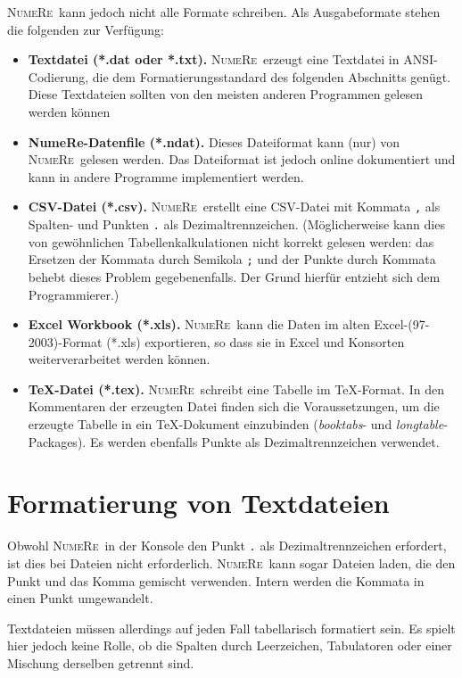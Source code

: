 \documentclass[DIV=14,headsepline,footsepline]{scrbook}
\newcommand{\NR}{\textsc{Nu\-me\-Re}}
\begin{document}
				\NR\ kann jedoch nicht alle Formate schreiben. Als Ausgabeformate stehen die folgenden zur Verfügung:
				\begin{itemize}
					\item \textbf{Textdatei (*.dat oder *.txt).} \NR\ erzeugt eine Textdatei in ANSI-Codierung, die dem Formatierungsstandard des folgenden Abschnitts genügt. Diese Textdateien sollten von den meisten anderen Programmen gelesen werden können
					\item \textbf{NumeRe-Datenfile (*.ndat).} Dieses Dateiformat kann (nur) von \NR\ gelesen werden. Das Dateiformat ist jedoch online dokumentiert und kann in andere Programme implementiert werden.
					\item \textbf{CSV-Datei (*.csv).} \NR\ erstellt eine CSV-Datei mit Kommata \lstinline+,+ als Spalten- und Punkten \lstinline+.+ als Dezimaltrennzeichen. (Möglicherweise kann dies von gewöhnlichen Tabellenkalkulationen nicht korrekt gelesen werden: das Ersetzen der Kommata durch Semikola \lstinline+;+ und der Punkte durch Kommata behebt dieses Problem gegebenenfalls. Der Grund hierfür entzieht sich dem Programmierer.)
					\item \textbf{Excel Workbook (*.xls).} \NR\ kann die Daten im alten Excel-(97-2003)-Format (*.xls) exportieren, so dass sie in Excel und Konsorten weiterverarbeitet werden können.
					\item \textbf{\TeX-Datei (*.tex).} \NR\ schreibt eine Tabelle im \TeX-Format. In den Kommentaren der erzeugten Datei finden sich die Voraussetzungen, um die erzeugte Tabelle in ein \TeX-Do\-ku\-ment einzubinden (\emph{booktabs}- und \emph{longtable}-Packages). Es werden ebenfalls Punkte als Dezimaltrennzeichen verwendet.
				\end{itemize}
				
			\section{Formatierung von Textdateien}
				Obwohl \NR\ in der Konsole den Punkt \lstinline+.+ als Dezimaltrennzeichen erfordert, ist dies bei Dateien nicht erforderlich. \NR\ kann sogar Dateien laden, die den Punkt und das Komma gemischt verwenden. Intern werden die Kommata in einen Punkt umgewandelt.
				
				Textdateien müssen allerdings auf jeden Fall tabellarisch formatiert sein. Es spielt hier jedoch keine Rolle, ob die Spalten durch Leerzeichen, Tabulatoren oder einer Mischung derselben getrennt sind.
				
\end{document}
